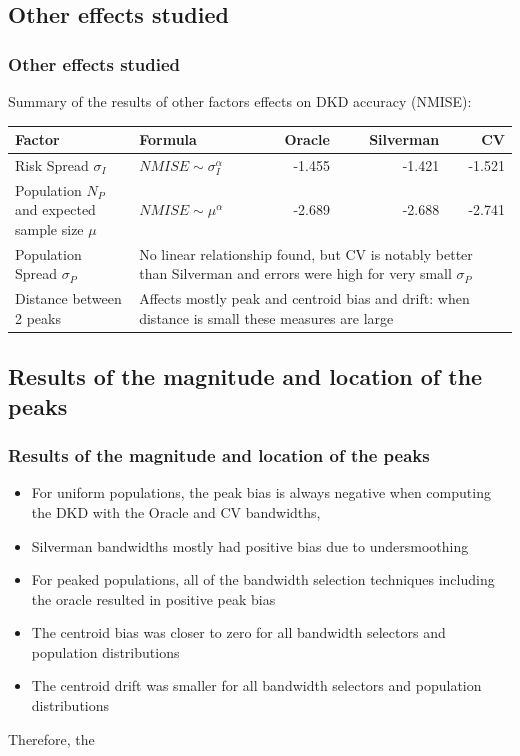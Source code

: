 \documentclass[notheorems]{beamer}
\theoremstyle{definition}
\theoremstyle{example}
\begin{document}
\subsection{Other effects studied}
\begin{frame}\frametitle{Other effects studied}
    Summary of the results of other factors effects on DKD accuracy (NMISE):
    {\scriptsize
    \begin{tabular}{p{3.5cm}lrrr}
        \toprule
        Factor & Formula & Oracle & Silverman & CV \tabularnewline
        \midrule
        Risk Spread $\sigma_I$ & $NMISE \sim \sigma_I^{\alpha}$ & -1.455 & -1.421 & -1.521 \\
        \raggedright Population $N_P$ and expected sample size $\mu$ & $NMISE \sim \mu^{\alpha}$ & -2.689 & -2.688 & -2.741 \\
        Population Spread $\sigma_P$ & \multicolumn{4}{p{6cm}}{\raggedright No linear relationship found, but CV is notably better than Silverman and errors were high for very small $\sigma_P$} \\
        Distance between 2 peaks  & \multicolumn{4}{p{6cm}}{\raggedright Affects mostly peak and centroid bias and drift: when distance is small these measures are large} \\
        \bottomrule
    \end{tabular}
    }
\end{frame}

\subsection{Results of the magnitude and location of the peaks}
\begin{frame}\frametitle{Results of the magnitude and location of the peaks}
    \footnotesize
    \begin{itemize}
        \item For uniform populations, the peak bias is always negative when computing the DKD with the Oracle and CV bandwidths,
        \item Silverman bandwidths mostly had positive bias due to undersmoothing
        \item For peaked populations, all of the bandwidth selection techniques including the oracle resulted in positive peak bias
        \item The centroid bias was closer to zero for all bandwidth selectors and population distributions
        \item The centroid drift was smaller for all bandwidth selectors and population distributions
    \end{itemize}
    Therefore, the 
\end{frame}
\end{document}
